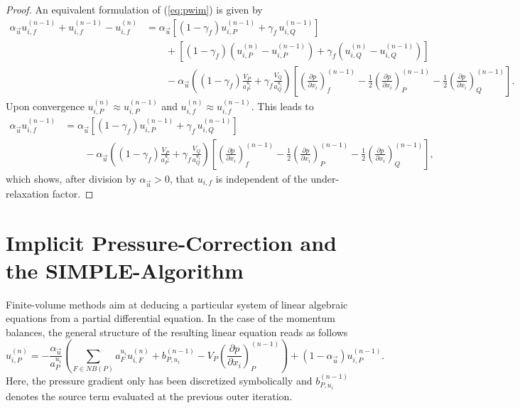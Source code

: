 \begin{proof}
  An equivalent formulation of (\ref{eq:pwim}) is given by
\begin{align*}
  \alpha_\vec{u} u_{i,f}^{(n-1)} + u_{i,f}^{(n-1)} - u_{i,f}^{(n)} 
  &=
  \alpha_\vec{u} \left[\left(1 - \gamma_f\right) u_{i,P}^{(n-1)} + \gamma_f \, u_{i,Q}^{(n-1)} \right] \\[1em]
  &\quad\quad + \left[\left(1 - \gamma_f\right) \left( u_{i,P}^{(n)} - u_{i,P}^{(n-1)}\right) + \gamma_f \left( u_{i,Q}^{(n)} - u_{i,Q}^{(n-1)} \right) \right] \nonumber\\[1em]
  &\quad\quad - 
  \alpha_\vec{u} \left(\left(1 - \gamma_f\right) \frac{ V_P}{a_P^{u_i}} + \gamma_f \frac{V_Q}{a_Q^{u_i}}\right)
  \left[ 
  \left(\frac{\partial p}{\partial x_i}\right)_f^{(n-1)} 
  - \frac{1}{2} \left( \frac{\partial p}{\partial x_i} \right)_P^{(n-1)} 
  - \frac{1}{2} \left(\frac{\partial p}{\partial x_i}\right)_Q^{(n-1)} 
  \right]. \nonumber
\end{align*}
  Upon convergence \(u_{i,P}^{(n)} \approx u_{i,P}^{(n-1)}\) and \(u_{i,f}^{(n)} \approx u_{i,f}^{(n-1)}\). This leads to
\begin{align*}
  \alpha_\vec{u} u_{i,f}^{(n-1)} 
  &=
  \alpha_\vec{u} \left[\left(1 - \gamma_f\right) u_{i,P}^{(n-1)} + \gamma_f \, u_{i,Q}^{(n-1)} \right] \\[1em]
  &\quad\quad - 
  \alpha_\vec{u} \left(\left(1 - \gamma_f\right) \frac{ V_P}{a_P^{u_i}} + \gamma_f \frac{V_Q}{a_Q^{u_i}}\right)
  \left[ 
  \left(\frac{\partial p}{\partial x_i}\right)_f^{(n-1)} 
  - \frac{1}{2} \left( \frac{\partial p}{\partial x_i} \right)_P^{(n-1)} 
  - \frac{1}{2} \left(\frac{\partial p}{\partial x_i}\right)_Q^{(n-1)} 
  \right], \nonumber
\end{align*}
which shows, after division by \(\alpha_\vec{u} > 0\), that \(u_{i,f}\) is independent of the under-relaxation factor.
\end{proof}

\section{Implicit Pressure-Correction and the SIMPLE-Algorithm}
\label{sec:simple}

Finite-volume methods aim at deducing a particular system of linear algebraic equations from a partial differential equation. In the case of the momentum balances, the general structure of the resulting linear equation reads as follows
\begin{displaymath}
  \label{eq:linfinal}
  u_{i,P}^{(n)} 
  = 
  - \frac{\alpha_{\vec{u}}}{a_P^{u_i}} \left(\sum_{F \in NB(P)} a_F^{u_i} u_{i,F}^{(n)}
  +                                     b_{P,u_i}^{(n-1)} 
  -                                     V_P\left(\frac{\partial p}{\partial x_i}\right)_P^{(n-1)} \right)
  + \left(1 - \alpha_{\vec{u}}\right) u_{i,P}^{(n-1)}.
\end{displaymath}
Here, the pressure gradient only has been discretized symbolically and \(b_{P,u_i}^{(n-1)}\) denotes the source term evaluated at the previous outer iteration.

